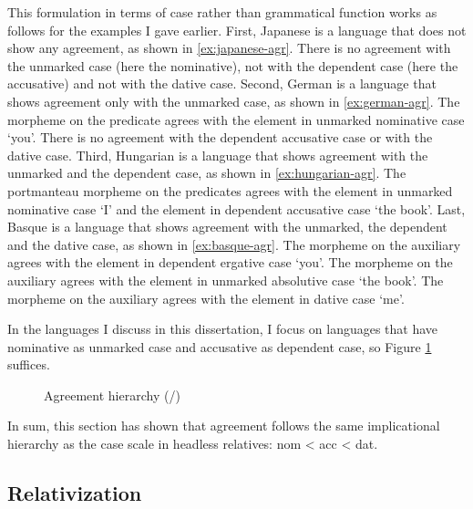 This formulation in terms of case rather than grammatical function works as follows for the examples I gave earlier.
First, Japanese is a language that does not show any agreement, as shown in \ref{ex:japanese-agr}. There is no agreement with the unmarked case (here the nominative), not with the dependent case (here the accusative) and not with the dative case.
Second, German is a language that shows agreement only with the unmarked case, as shown in \ref{ex:german-agr}. The morpheme  on the predicate agrees with the element in unmarked nominative case  `you'. There is no agreement with the dependent accusative case or with the dative case.
Third, Hungarian is a language that shows agreement with the unmarked and the dependent case, as shown in \ref{ex:hungarian-agr}. The portmanteau morpheme  on the predicates agrees with the element in unmarked nominative case  `I' and the element in dependent accusative case  `the book'.
Last, Basque is a language that shows agreement with the unmarked, the dependent and the dative case, as shown in \ref{ex:basque-agr}. The morpheme  on the auxiliary agrees with the element in dependent ergative case  `you'. The morpheme  on the auxiliary agrees with the element in unmarked absolutive case  `the book'. The morpheme  on the auxiliary agrees with the element in dative case  `me'.

In the languages I discuss in this dissertation, I focus on languages that have nominative as unmarked case and accusative as dependent case, so Figure \ref{fig:agr-nom-acc-dat} suffices.

\begin{figure}[ht]
  \centering
  \label{fig:agr-nom-acc-dat}
  \caption{Agreement hierarchy (/)}
\end{figure}

In sum, this section has shown that agreement follows the same implicational hierarchy as the case scale in headless relatives: \ac{nom} < \ac{acc} < \ac{dat}.


\subsection{Relativization}

